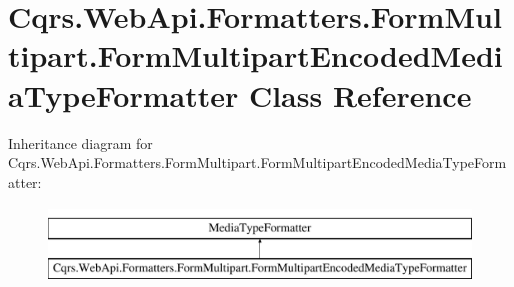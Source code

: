 \hypertarget{classCqrs_1_1WebApi_1_1Formatters_1_1FormMultipart_1_1FormMultipartEncodedMediaTypeFormatter}{}\section{Cqrs.\+Web\+Api.\+Formatters.\+Form\+Multipart.\+Form\+Multipart\+Encoded\+Media\+Type\+Formatter Class Reference}
\label{classCqrs_1_1WebApi_1_1Formatters_1_1FormMultipart_1_1FormMultipartEncodedMediaTypeFormatter}
Inheritance diagram for Cqrs.\+Web\+Api.\+Formatters.\+Form\+Multipart.\+Form\+Multipart\+Encoded\+Media\+Type\+Formatter\+:\begin{figure}[H]
\begin{center}
\leavevmode
\includegraphics[height=2.000000cm]{classCqrs_1_1WebApi_1_1Formatters_1_1FormMultipart_1_1FormMultipartEncodedMediaTypeFormatter}
\end{center}
\end{figure}
